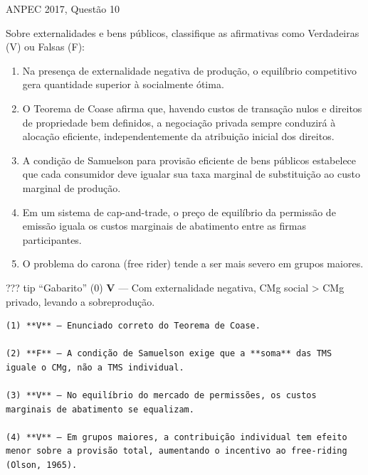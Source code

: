 \documentclass[11pt,twoside,openright]{book}
\begin{document}
\begin{infobox}{ANPEC 2017, Questão 10}

Sobre externalidades e bens públicos, classifique as afirmativas como
Verdadeiras (V) ou Falsas (F):

\begin{enumerate}
\def\labelenumi{(\arabic{enumi})}
\setcounter{enumi}{-1}
\item
  Na presença de externalidade negativa de produção, o equilíbrio
  competitivo gera quantidade superior à socialmente ótima.
\item
  O Teorema de Coase afirma que, havendo custos de transação nulos e
  direitos de propriedade bem definidos, a negociação privada sempre
  conduzirá à alocação eficiente, independentemente da atribuição
  inicial dos direitos.
\item
  A condição de Samuelson para provisão eficiente de bens públicos
  estabelece que cada consumidor deve igualar sua taxa marginal de
  substituição ao custo marginal de produção.
\item
  Em um sistema de cap-and-trade, o preço de equilíbrio da permissão de
  emissão iguala os custos marginais de abatimento entre as firmas
  participantes.
\item
  O problema do carona (free rider) tende a ser mais severo em grupos
  maiores.
\end{enumerate}

??? tip ``Gabarito'' (0) \textbf{V} --- Com externalidade negativa, CMg
social \textgreater{} CMg privado, levando a sobreprodução.

\begin{verbatim}
(1) **V** — Enunciado correto do Teorema de Coase.

(2) **F** — A condição de Samuelson exige que a **soma** das TMS iguale o CMg, não a TMS individual.

(3) **V** — No equilíbrio do mercado de permissões, os custos marginais de abatimento se equalizam.

(4) **V** — Em grupos maiores, a contribuição individual tem efeito menor sobre a provisão total, aumentando o incentivo ao free-riding (Olson, 1965).
\end{verbatim}

\end{infobox}
\end{document}
